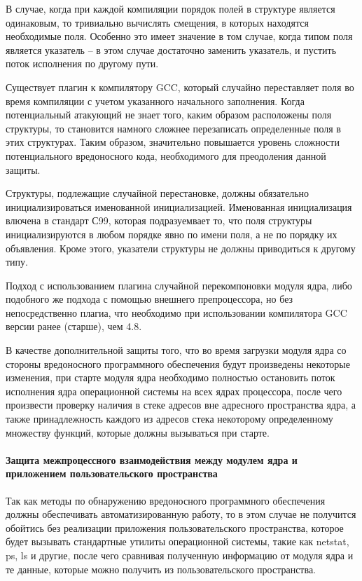 \documentclass{gost7.32-2001}
\begin{document}
В случае, когда при каждой компиляции порядок полей в структуре
является одинаковым, то тривиально вычислять смещения, в которых
находятся необходимые поля. Особенно это имеет значение в том случае,
когда типом поля является указатель – в этом случае достаточно
заменить указатель, и пустить поток исполнения по другому пути.

Существует плагин  к компилятору GCC, который
случайно переставляет поля во время компиляции с учетом указанного
начального заполнения. Когда потенциальный атакующий не знает того,
каким образом расположены поля структуры, то становится намного
сложнее перезаписать определенные поля в этих структурах. Таким
образом, значительно повышается уровень сложности потенциального
вредоносного кода, необходимого для преодоления данной защиты.

Структуры, подлежащие случайной перестановке, должны обязательно
инициализироваться именованной инициализацией. Именованная
инициализация влючена в стандарт С99, которая подразуемвает то, что
поля структуры инициализируются в любом порядке явно по имени поля, а
не по порядку их объявления. Кроме этого, указатели структуры не
должны приводиться к другому типу.

Подход с использованием плагина случайной перекомпоновки модуля ядра,
либо подобного же подхода с помощью внешнего препроцессора, но без
непосредственно плагиа, что необходимо при использовании компилятора
GCC версии ранее (старше), чем 4.8.

В качестве дополнительной защиты того, что во время загрузки модуля
ядра со стороны вредоносного программного обеспечения будут
произведены некоторые изменения, при старте модуля ядра необходимо
полностью остановить поток исполнения ядра операционной системы на
всех ядрах процессора, после чего произвести проверку наличия в стеке
адресов вне адресного пространства ядра, а также принадлежность
каждого из адресов стека некоторому определенному множеству функций,
которые должны вызываться при старте.

\paragraph{Защита межпроцессного взаимодействия между модулем ядра и приложением пользовательского пространства}

Так как методы по обнаружению вредоносного программного обеспечения
должны обеспечивать автоматизированную работу, то в этом случае не
получится обойтись без реализации приложения пользовательского
пространства, которое будет вызывать стандартные утилиты операционной
системы, такие как netstat, ps, ls и другие, после чего сравнивая
полученную информацию от модуля ядра и те данные, которые можно
получить из пользовательского пространства.
\end{document}

